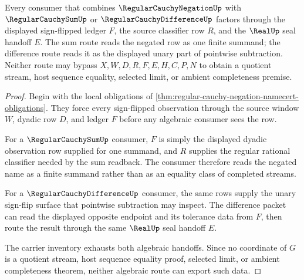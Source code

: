 \begin{theorem}
\label{thm:regular-cauchy-negation-algebraic-handoff}
Every consumer that combines $\RegularCauchyNegationUp$ with $\RegularCauchySumUp$ or $\RegularCauchyDifferenceUp$ factors through the displayed sign-flipped ledger $F$, the source classifier row $R$, and the $\RealUp$ seal handoff $E$. The sum route reads the negated row as one finite summand; the difference route reads it as the displayed unary part of pointwise subtraction. Neither route may bypass $X,W,D,R,F,E,H,C,P,N$ to obtain a quotient stream, host sequence equality, selected limit, or ambient completeness premise.
\end{theorem}
\begin{proof}
Begin with the local obligations of \autoref{thm:regular-cauchy-negation-namecert-obligations}. They force every sign-flipped observation through the source window $W$, dyadic row $D$, and ledger $F$ before any algebraic consumer sees the row.

For a $\RegularCauchySumUp$ consumer, $F$ is simply the displayed dyadic observation row supplied for one summand, and $R$ supplies the regular rational classifier needed by the sum readback. The consumer therefore reads the negated name as a finite summand rather than as an equality class of completed streams.

For a $\RegularCauchyDifferenceUp$ consumer, the same rows supply the unary sign-flip surface that pointwise subtraction may inspect. The difference packet can read the displayed opposite endpoint and its tolerance data from $F$, then route the result through the same $\RealUp$ seal handoff $E$.

The carrier inventory exhausts both algebraic handoffs. Since no coordinate of $G$ is a quotient stream, host sequence equality proof, selected limit, or ambient completeness theorem, neither algebraic route can export such data.
\end{proof}

